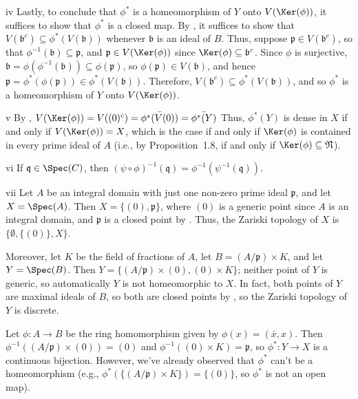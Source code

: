 \begin{partsolution}{iv}
Lastly, to conclude that \(\phi^*\) is a homeomorphism of \(Y\) onto \(V(\Ker(\phi))\), it suffices to show that \(\phi^*\) is a closed map.
By , it suffices to show that \(V(\mathfrak{b}^c) \subseteq \phi^*(V(\mathfrak{b}))\) whenever \(\mathfrak{b}\) is an ideal of \(B\).
Thus, suppose \(\mathfrak{p} \in V(\mathfrak{b}^c)\), so that \(\phi^{-1}(\mathfrak{b}) \subseteq \mathfrak{p}\), and \(\mathfrak{p} \in V(\Ker(\phi))\) since \(\Ker(\phi) \subseteq \mathfrak{b}^c\).
Since \(\phi\) is surjective, \(\mathfrak{b} = \phi(\phi^{-1}(\mathfrak{b})) \subseteq \phi(\mathfrak{p})\), so \(\phi(\mathfrak{p}) \in V(\mathfrak{b})\), and hence \(\mathfrak{p} = \phi^*(\phi(\mathfrak{p})) \in \phi^*(V(\mathfrak{b}))\).
Therefore, \(V(\mathfrak{b}^c) \subseteq \phi^*(V(\mathfrak{b}))\), and so \(\phi^*\) is a homeomorphism of \(Y\) onto \(V(\Ker(\phi))\).
\end{partsolution}

\begin{partsolution}{v}
By , \(V(\Ker(\phi)) = V((0)^c) = \bar{\phi^*(V(0))} = \bar{\phi^*(Y)}\)
Thus, \(\phi^*(Y)\) is dense in \(X\) if and only if \(V(\Ker(\phi)) = X\), which is the case if and only if \(\Ker(\phi)\) is contained in every prime ideal of \(A\) (i.e., by Proposition~1.8, if and only if \(\Ker(\phi) \subseteq \mathfrak{N}\)).
\end{partsolution}

\begin{partsolution}{vi}
If \(\mathfrak{q} \in \Spec(C)\), then \((\psi \circ \phi)^{-1}(\mathfrak{q}) = \phi^{-1}(\psi^{-1}(\mathfrak{q}))\).
\end{partsolution}

\begin{partsolution}{vii}
Let \(A\) be an integral domain with just one non-zero prime ideal \(\mathfrak{p}\), and let \(X = \Spec(A)\).
Then \(X = \{(0), \mathfrak{p}\}\), where \((0)\) is a generic point since \(A\) is an integral domain, and \(\mathfrak{p}\) is a closed point by .
Thus, the Zariski topology of \(X\) is \(\{\emptyset, \{(0)\}, X\}\).

Moreover, let \(K\) be the field of fractions of \(A\), let \(B = (A / \mathfrak{p}) \times K\), and let \(Y = \Spec(B)\).
Then \(Y = \{(A / \mathfrak{p}) \times (0), (0) \times K\}\); neither point of \(Y\) is generic, so automatically \(Y\) is not homeomorphic to \(X\).
In fact, both points of \(Y\) are maximal ideals of \(B\), so both are closed points by , so the Zariski topology of \(Y\) is discrete.

Let \(\phi : A \to B\) be the ring homomorphism given by \(\phi(x) = (\bar{x}, x)\).
Then \(\phi^{-1}((A / \mathfrak{p}) \times (0)) = (0)\) and \(\phi^{-1}((0) \times K) = \mathfrak{p}\), so \(\phi^* : Y \to X\) is a continuous bijection.
However, we've already observed that \(\phi^*\) can't be a homeomorphism (e.g., \(\phi^*(\{(A / \mathfrak{p}) \times K\}) = \{(0)\}\), so \(\phi^*\) is not an open map).
\end{partsolution}